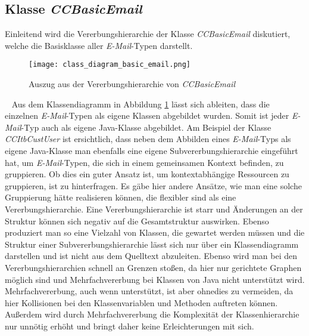 \subsection{Klasse \emph{CCBasicEmail}}
\label{sec:implementierung-ccbasic-mail}
Einleitend wird die Vererbungshierarchie der Klasse \emph{CCBasicEmail} diskutiert, welche die Basisklasse aller \emph{E-Mail}-Typen darstellt.
\begin{figure}[h]
\centering
\texttt{[image: class\_diagram\_basic\_email.png]} 
\caption{Auszug aus der Vererbungshierarchie von \emph{CCBasicEmail}}
\label{fig:klassen-hierarchie-ccbasicemail}
\end{figure}
\ \newline
Aus dem Klassendiagramm in Abbildung \ref{fig:klassen-hierarchie-ccbasicemail} lässt sich ableiten, dass die einzelnen \emph{E-Mail}-Typen als eigene Klassen abgebildet wurden. Somit ist jeder \emph{E-Mail}-Typ auch als eigene Java-Klasse abgebildet. 
\newline
\newline
Am Beispiel der Klasse \emph{CCItbCustUser} ist ersichtlich, dass neben dem Abbilden eines \emph{E-Mail}-Typs als eigene Java-Klasse man ebenfalls eine eigene Subvererbungshierarchie eingeführt hat, um \emph{E-Mail}-Typen, die sich in einem gemeinsamen Kontext befinden, zu gruppieren. Ob dies ein guter Ansatz ist, um kontextabhängige Ressourcen zu gruppieren, ist zu hinterfragen. Es gäbe hier andere Ansätze, wie man eine solche Gruppierung hätte realisieren können, die flexibler sind als eine Vererbungshierarchie. Eine Vererbungshierarchie ist starr und Änderungen an der Struktur können sich negativ auf die Gesamtstruktur auswirken. Ebenso produziert man so eine Vielzahl von Klassen, die gewartet werden müssen und die Struktur einer Subvererbungshierarchie lässt sich nur über ein Klassendiagramm darstellen und ist nicht aus dem Quelltext abzuleiten. Ebenso wird man bei den Vererbungshierarchien schnell an Grenzen stoßen, da hier nur gerichtete Graphen möglich sind und Mehrfachvererbung bei Klassen von Java nicht unterstützt wird. 
\newline
\newline
Mehrfachvererbung, auch wenn unterstützt, ist aber ohnedies zu vermeiden, da hier Kollisionen bei den Klassenvariablen und Methoden auftreten können. Außerdem wird durch Mehrfachvererbung die Komplexität der Klassenhierarchie nur unnötig erhöht und bringt daher keine Erleichterungen mit sich.

